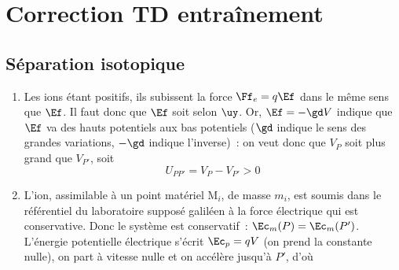 \documentclass[a4paper, 12pt, final, garamond]{book}
\begin{document}
\setcounter{chapter}{4}

\chapter{Correction TD entra\^inement}

\section{Séparation isotopique}
\begin{enumerate}
    \item Les ions étant positifs, ils subissent la force $\Ff_e = q\Ef$ dans le
        même sens que $\Ef$. Il faut donc que $\Ef$ soit selon $\uy$. Or, $\Ef =
        -\gd V$ indique que $\Ef$ va des hauts potentiels aux bas potentiels
        ($\gd$ indique le sens des grandes variations, $-\gd$ indique
        l'inverse)~: on veut donc que $V_P$ soit plus grand que $V_{P'}$, soit
        \[U_{PP'} = V_P - V_{P'} > 0\]

    \item L'ion, assimilable à un point matériel M$_i$, de masse $m_i$, est
        soumis dans le référentiel du laboratoire supposé galiléen à la force
        électrique qui est conservative. Donc le système est conservatif~:
        $\Ec_m(P)=\Ec_m(P')$. L'énergie potentielle électrique s'écrit
        $\Ec_p=qV$ (on prend la constante nulle), on part à vitesse nulle et on
        accélère jusqu'à $P'$, d'où


\end{enumerate}
\end{document}
